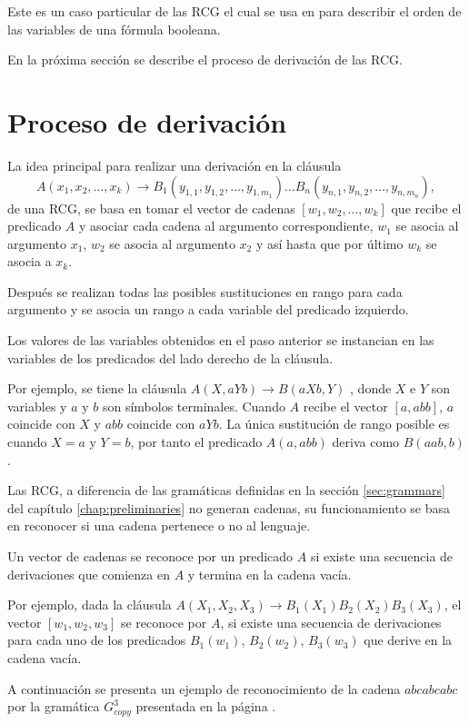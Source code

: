 \documentclass[12pt]{article}
\begin{document}
Este es un caso particular de las RCG el cual se usa en \cite{aSRCSAT} para describir el orden de las variables de una fórmula booleana.

En la próxima sección se describe el proceso de derivación de las RCG.

\section{Proceso de derivación}

La idea principal para realizar una derivación en la cláusula 
\[
    A(x_1, x_2, \ldots, x_k) \to B_1(y_{1,1}, y_{1,2}, \ldots, y_{1,m_1}) \ldots B_n(y_{n,1}, y_{n,2}, \ldots, y_{n,m_n}),
\]
de una RCG, se basa en tomar el vector de cadenas $[w_1, w_2,\ldots, w_k]$ que recibe el predicado $A$ y asociar cada cadena al argumento 
correspondiente, $w_1$ se asocia al argumento $x_1$, $w_2$ se asocia al argumento $x_2$ y así hasta que por último
$w_k$ se asocia a $x_k$. 

Después se realizan todas las posibles sustituciones en rango para cada argumento y se asocia un rango a 
cada variable del predicado izquierdo.

Los valores de las variables obtenidos en el paso anterior se instancian en las variables de los predicados del lado derecho de la cláusula.

Por ejemplo, se tiene la cláusula $A(X,aYb)\to B(aXb,Y)$ , donde $X$ e $Y$ son variables y $a$ y $b$ son símbolos 
terminales. Cuando $A$ recibe el vector $[a,abb]$, $a$ coincide con $X$ y $abb$ coincide con $aYb$. La única sustitución de 
rango posible es cuando $X=a$ y $Y=b$, por tanto el predicado $A(a,abb)$ deriva como $B(aab,b)$.

Las RCG, a diferencia de las gramáticas definidas en la sección \ref{sec:grammars} del capítulo \ref{chap:preliminaries} no generan cadenas, su funcionamiento se basa en reconocer si una cadena pertenece o no al lenguaje.

Un vector de cadenas se reconoce por un predicado $A$ si existe una secuencia de derivaciones que comienza en $A$ y termina en la cadena vacía.

Por ejemplo, dada la cláusula $A(X_1,X_2,X_3)\to B_1(X_1)B_2(X_2)B_3(X_3)$, el vector $[w_1,w_2,w_3]$ se reconoce por $A$, si existe una secuencia de derivaciones para cada uno de los predicados $B_1(w_1)$, $B_2(w_2)$, $B_3(w_3)$ que derive en la cadena vacía.

A continuación se presenta un ejemplo de reconocimiento de la cadena $abcabcabc$ por la gramática $G^3_{copy}$
presentada en la página \pageref{g_3copy}.
\end{document}
